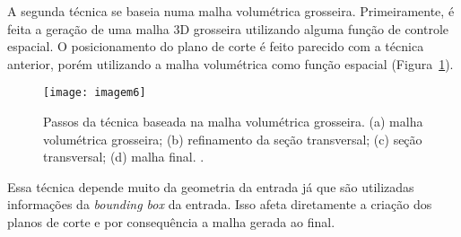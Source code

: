 A segunda técnica se baseia numa malha volumétrica grosseira. Primeiramente, é feita a geração de uma malha 3D grosseira utilizando alguma função de controle espacial. O posicionamento do plano de corte é feito parecido com a técnica anterior, porém utilizando a malha volumétrica como função espacial (Figura~\ref{fig:imagem6}).

 \begin{figure}[htbp]
     \centering
     \texttt{[image: imagem6]}
     \caption{Passos da técnica baseada na malha volumétrica grosseira. (a) malha volumétrica grosseira; (b) refinamento da seção transversal; (c) seção transversal; (d) malha final. \cite{bib:Glut08}.}
     \label{fig:imagem6}
 \end{figure}

Essa técnica depende muito da geometria da entrada já que são utilizadas informações da \textit{bounding box} da entrada. Isso afeta diretamente a criação dos planos de corte e por consequência a malha gerada ao final.

